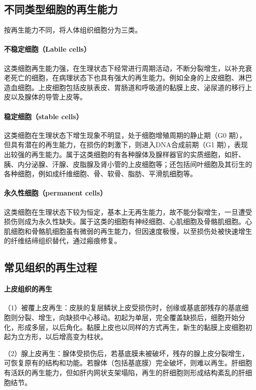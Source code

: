 \subsection{不同类型细胞的再生能力}

按再生能力不同，将人体组织细胞分为三类。

\paragraph{不稳定细胞（Labile cells）}
这类细胞再生能力强，在生理状态下经常进行周期活动，不断分裂增生，以补充衰老死亡的细胞，在病理状态下也具有强大的再生能力。例如全身的上皮细胞、淋巴造血细胞。上皮细胞包括皮肤表皮、胃肠道和呼吸道的黏膜上皮、泌尿道的移行上皮以及腺体的导管上皮等。

\paragraph{稳定细胞（stable cells）}
这类细胞在生理状态下增生现象不明显，处于细胞增殖周期的静止期（G{0}
期），但具有潜在的再生能力，在损伤的刺激下，则进入DNA合成前期（G{1}
期），表现出较强的再生能力。属于这类细胞的有各种腺体及腺样器官的实质细胞，如肝、胰、内分泌腺、汗腺、皮脂腺及肾小管的上皮细胞等；还包括间叶细胞及其衍生的各种细胞，例如成纤维细胞、骨、软骨、脂肪、平滑肌细胞等。

\paragraph{永久性细胞（permanent cells）}
这类细胞在生理状态下较为恒定，基本上无再生能力，故不能分裂增生，一旦遭受损伤则成为永久性缺失。属于这类的细胞有神经细胞、心肌细胞及骨骼肌细胞。心肌细胞和骨骼肌细胞虽有微弱的再生能力，但因速度极慢，以至损伤处被快速增生的纤维结缔组织替代，通过瘢痕修复。

\subsection{常见组织的再生过程}

\paragraph{上皮组织的再生}
（1）被覆上皮再生：皮肤的复层鳞状上皮受损伤时，创缘或基底部残存的基底细胞则分裂、增生，向缺损中心移动。初起为单层，完全覆盖缺损后，细胞开始分化，形成多层，以后角化。黏膜上皮也以同样的方式再生，新生的黏膜上皮细胞初起为立方形，以后增高变为柱状。

（2）腺上皮再生：腺体受损伤后，若基底膜未被破坏，残存的腺上皮分裂增生，可恢复原有的结构和功能。若腺体（包括基底膜）完全破坏，则难以再生。肝细胞有活跃的再生能力，但如肝内网状支架塌陷，再生的肝细胞则形成结构紊乱的肝细胞结节。

